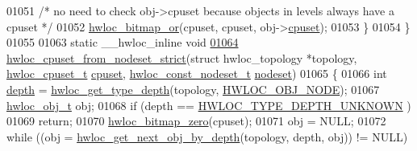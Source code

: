 \begin{DoxyCode}
01051                         \textcolor{comment}{/* no need to check obj->cpuset because objects in levels
       always have a cpuset */}
01052                         \hyperlink{a00065_ga1ba1de709ee9a7cf5cc8ad2d9a1a81d4}{hwloc_bitmap_or}(cpuset, cpuset, obj->\hyperlink{a00016_a67925e0f2c47f50408fbdb9bddd0790f}{cpuset});
01053         \}
01054 \}
01055 
01063 \textcolor{keyword}{static} \_\_hwloc\_inline \textcolor{keywordtype}{void}
\hypertarget{a00031_source_l01064}{}\hyperlink{a00062_gaa7c3f39802b00a758c58e024a8119979}{01064} \hyperlink{a00062_gaa7c3f39802b00a758c58e024a8119979}{hwloc_cpuset_from_nodeset_strict}(\textcolor{keyword}{struct} hwloc\_topology *topology, \hyperlink{a00040_ga4bbf39b68b6f568fb92739e7c0ea7801}{hwloc_cpuset_t} 
      \hyperlink{a00016_a67925e0f2c47f50408fbdb9bddd0790f}{cpuset}, \hyperlink{a00040_ga2f5276235841ad66a79bedad16a5a10c}{hwloc_const_nodeset_t} \hyperlink{a00016_a08f0d0e16c619a6e653526cbee4ffea3}{nodeset})
01065 \{
01066         \textcolor{keywordtype}{int} \hyperlink{a00016_a9d82690370275d42d652eccdea5d3ee5}{depth} = \hyperlink{a00046_gaea7c64dd59467f5201ba87712710b14d}{hwloc_get_type_depth}(topology, \hyperlink{a00041_ggacd37bb612667dc437d66bfb175a8dc55aaf0964881117bdedf1a5e9332cd120dd}{HWLOC_OBJ_NODE});
01067         \hyperlink{a00016}{hwloc_obj_t} obj;
01068         \textcolor{keywordflow}{if} (depth == \hyperlink{a00046_ggaf4e663cf42bbe20756b849c6293ef575a0565ab92ab72cb0cec91e23003294aad}{HWLOC_TYPE_DEPTH_UNKNOWN} )
01069                 \textcolor{keywordflow}{return};
01070         \hyperlink{a00065_ga6c540b9fe63b8223b6aba46d56dd63b8}{hwloc_bitmap_zero}(cpuset);
01071         obj = NULL;
01072         \textcolor{keywordflow}{while} ((obj = \hyperlink{a00053_gab7c1dce3f42ece5bfa621e87cf332418}{hwloc_get_next_obj_by_depth}(topology, depth, obj)) != NULL)
      

\end{DoxyCode}
